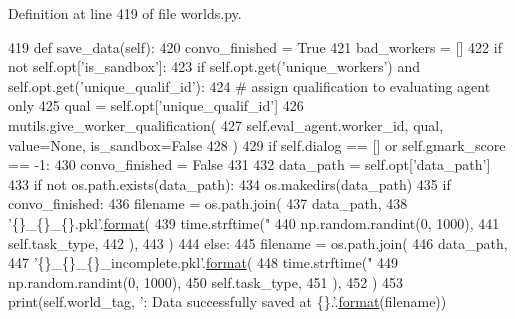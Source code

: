 Definition at line 419 of file worlds.\+py.


\begin{DoxyCode}
419     \textcolor{keyword}{def }save\_data(self):
420         convo\_finished = \textcolor{keyword}{True}
421         bad\_workers = []
422         \textcolor{keywordflow}{if} \textcolor{keywordflow}{not} self.opt[\textcolor{stringliteral}{'is\_sandbox'}]:
423             \textcolor{keywordflow}{if} self.opt.get(\textcolor{stringliteral}{'unique\_workers'}) \textcolor{keywordflow}{and} self.opt.get(\textcolor{stringliteral}{'unique\_qualif\_id'}):
424                 \textcolor{comment}{# assign qualification to evaluating agent only}
425                 qual = self.opt[\textcolor{stringliteral}{'unique\_qualif\_id'}]
426                 mutils.give\_worker\_qualification(
427                     self.eval\_agent.worker\_id, qual, value=\textcolor{keywordtype}{None}, is\_sandbox=\textcolor{keyword}{False}
428                 )
429         \textcolor{keywordflow}{if} self.dialog == [] \textcolor{keywordflow}{or} self.gmark\_score == -1:
430             convo\_finished = \textcolor{keyword}{False}
431 
432         data\_path = self.opt[\textcolor{stringliteral}{'data\_path'}]
433         \textcolor{keywordflow}{if} \textcolor{keywordflow}{not} os.path.exists(data\_path):
434             os.makedirs(data\_path)
435         \textcolor{keywordflow}{if} convo\_finished:
436             filename = os.path.join(
437                 data\_path,
438                 \textcolor{stringliteral}{'\{\}\_\{\}\_\{\}.pkl'}.\hyperlink{namespaceparlai_1_1chat__service_1_1services_1_1messenger_1_1shared__utils_a32e2e2022b824fbaf80c747160b52a76}{format}(
439                     time.strftime(\textcolor{stringliteral}{"%
440                     np.random.randint(0, 1000),
441                     self.task\_type,
442                 ),
443             )
444         \textcolor{keywordflow}{else}:
445             filename = os.path.join(
446                 data\_path,
447                 \textcolor{stringliteral}{'\{\}\_\{\}\_\{\}\_incomplete.pkl'}.\hyperlink{namespaceparlai_1_1chat__service_1_1services_1_1messenger_1_1shared__utils_a32e2e2022b824fbaf80c747160b52a76}{format}(
448                     time.strftime(\textcolor{stringliteral}{"%
449                     np.random.randint(0, 1000),
450                     self.task\_type,
451                 ),
452             )
453         print(self.world\_tag, \textcolor{stringliteral}{': Data successfully saved at \{\}.'}.\hyperlink{namespaceparlai_1_1chat__service_1_1services_1_1messenger_1_1shared__utils_a32e2e2022b824fbaf80c747160b52a76}{format}(filename))
}}
\end{DoxyCode}
